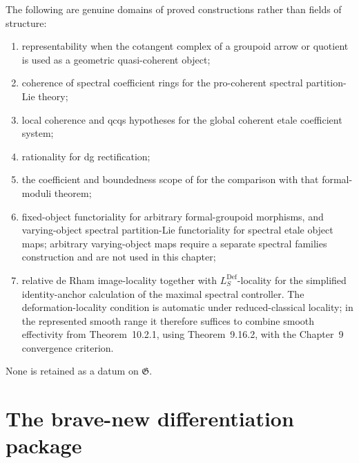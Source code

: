 The following are genuine domains of proved constructions rather than fields
of structure:
\begin{enumerate}
    \item representability when the cotangent complex of a groupoid arrow or
    quotient is used as a geometric quasi-coherent object;
    \item coherence of spectral coefficient rings for the pro-coherent
    spectral partition-Lie theory;
    \item local coherence and qcqs hypotheses for the global coherent etale
    coefficient system;
    \item rationality for dg rectification;
    \item the coefficient and boundedness scope of \cite{Nuiten2019} for the
    comparison with that formal-moduli theorem;
    \item fixed-object functoriality for arbitrary formal-groupoid morphisms,
    and varying-object spectral partition-Lie functoriality for spectral etale
    object maps; arbitrary varying-object maps require a separate spectral
    families construction and are not used in this chapter;
    \item relative de Rham image-locality together with
    $L^{\mathrm{Def}}_S$-locality for the simplified identity-anchor
    calculation of the maximal spectral controller.  The deformation-locality
    condition is automatic under reduced-classical locality; in the
    represented smooth range it therefore suffices to combine smooth
    effectivity from Theorem~10.2.1, using Theorem~9.16.2, with the Chapter~9
    convergence criterion.
\end{enumerate}
None is retained as a datum on $\mathfrak G$.

\section{The brave-new differentiation package}
\label{sec:bnla-synthesis}

